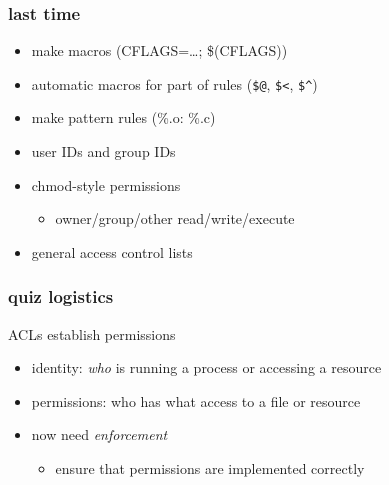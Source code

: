 \date{}
\title{}
\date{}

\begin{frame}
    \titlepage
\end{frame}

\begin{FragileFrame}
\frametitle{last time}
    \begin{itemize}
    \item make macros (CFLAGS=\ldots; \$(CFLAGS))
    \item automatic macros for part of rules (\verb|$@|, \verb|$<|, \verb|$^|)
    \item make pattern rules (\%.o: \%.c)
    \vspace{.5cm}
    \item user IDs and group IDs
    \item chmod-style permissions
        \begin{itemize}
        \item owner/group/other read/write/execute
        \end{itemize}
    \item general access control lists
    \end{itemize}
\end{FragileFrame}

\begin{frame}
\frametitle{quiz logistics}
\end{frame}

\begin{frame}{ACLs establish permissions}
    \begin{itemize}
        \item identity: \textit{who} is running a process or accessing a resource
        \item permissions: who has what access to a file or resource
        \item now need \textit{enforcement}
            \begin{itemize}
            \item ensure that permissions are implemented correctly
            \end{itemize}
    \end{itemize}
\end{frame}



%

